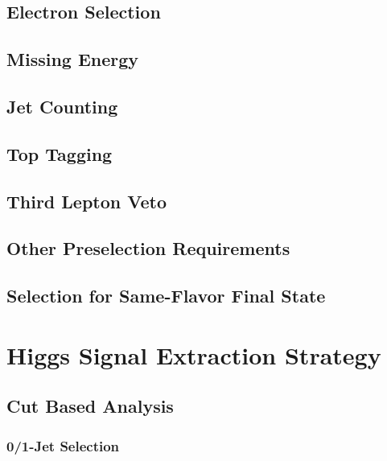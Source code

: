 \documentclass{cmspaper}
\begin{document}
   \subsection{Electron Selection} 
     \label{sec:sel_electrons}
   \subsection{Missing Energy} 
     \label{sec:sel_met}
   \subsection{Jet Counting} 
     \label{sec:sel_jets}
  \subsection{Top Tagging}
     \label{sec:sel_toptag}
   \subsection{Third Lepton Veto}
     \label{sec:sel_lepveto}
   \subsection{Other Preselection Requirements}
     \label{sec:sel_other}
   \subsection{Selection for Same-Flavor Final State}
     \label{sec:sel_sf}

\section{Higgs Signal Extraction Strategy}
   \label{sec:signal_selection}
   \subsection{Cut Based Analysis}
     \label{sec:anal_cutbased}
       \subsubsection{0/1-Jet Selection}
         \label{sec:sel_zerojet}
\end{document}
